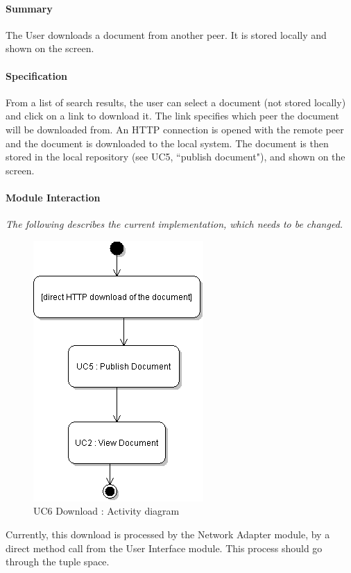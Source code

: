 \documentclass[titlepage]{article}%
\begin{document}
\paragraph{Summary}
The User downloads a document from another peer. It is stored locally and shown on the screen.

\paragraph{Specification}
From a list of search results, the user can select a document (not stored locally) and click on a link to download it. The link specifies which peer the document will be downloaded from. An HTTP connection is opened with the remote peer and the document is downloaded to the local system. The document is then stored in the local repository (see UC5, ``publish document"), and shown on the screen.

\paragraph{Module Interaction}
\emph{The following describes the current implementation, which needs to be changed.}
\begin{figure}[htb]
\centering
	\includegraphics[scale=0.5]{diagrams/uc4-download.png}
	\caption{UC6 Download : Activity diagram}
	\label{fig:uc6}
\end{figure}

Currently, this download is processed by the Network Adapter module, by a direct method call from the User Interface module. This process should go through the tuple space.
\end{document}
